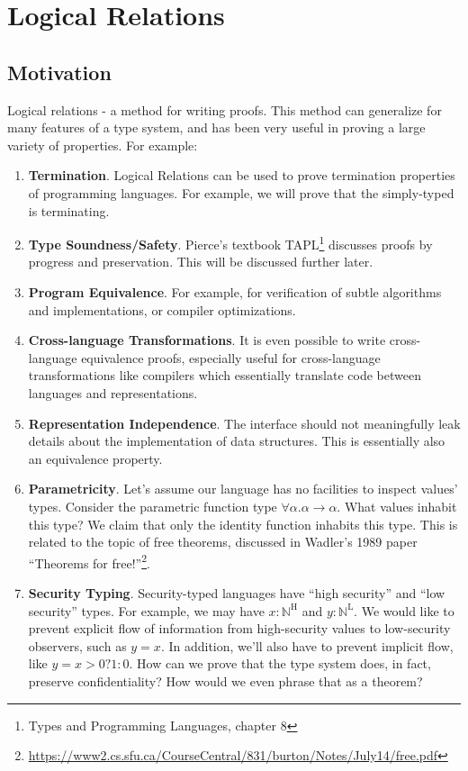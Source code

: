 \section{Logical Relations}
\label{sec:logicalrels}
\begin{abstract}
\end{abstract}



\subsection{Motivation}
Logical relations - a method for writing proofs. This method can generalize for many features of a type system, and has been
very useful in proving a large variety of properties. For example:
\begin{enumerate}
\item \textbf{Termination}. Logical Relations can be used to prove termination properties of programming
languages. For example, we will prove that the simply-typed \lc is terminating.
\item \textbf{Type Soundness/Safety}. Pierce's textbook TAPL\footnote{Types and Programming Languages, chapter 8} discusses
proofs by progress and preservation. This will be discussed further later.
\item \textbf{Program Equivalence}. For example, for verification of subtle algorithms and implementations, or compiler optimizations. 
\item \textbf{Cross-language Transformations}. It is even possible to write cross-language equivalence proofs, especially
useful for cross-language transformations like compilers which essentially translate code between languages and
representations.
\item \textbf{Representation Independence}. The interface should not meaningfully leak details about the implementation
of data structures. This is essentially also an equivalence property.
\item \textbf{Parametricity}. Let's assume our language has no facilities to inspect values' types. Consider
the parametric function type $\forall \alpha. \alpha \to \alpha$. What values inhabit this type? We claim
that only the identity function inhabits this type. This is related to the topic of free theorems, discussed in
Wadler's 1989 paper  ``Theorems for free!''\footnote{\href{https://www2.cs.sfu.ca/CourseCentral/831/burton/Notes/July14/free.pdf}
{https://www2.cs.sfu.ca/CourseCentral/831/burton/Notes/July14/free.pdf}}.
\item \textbf{Security Typing}. Security-typed languages have ``high security'' and ``low security'' types. For example,
we may have $x: \mathbb{N}^\mathrm{H}$ and $y: \mathbb{N}^\mathrm{L}$. We would like to prevent explicit flow
of information from high-security values to low-security observers, such as $y = x$. In addition, we'll also have to
prevent implicit flow, like $y = x > 0 ? 1 : 0$. How can we prove that the type system does, in fact, preserve
confidentiality? How would we even phrase that as a theorem?
\end{enumerate}

